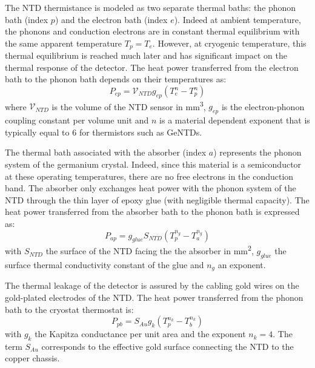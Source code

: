 The NTD thermistance is modeled as two separate thermal baths: the phonon bath (index $p$) and the electron bath (index $e$). Indeed at ambient temperature, the phonons and conduction electrons are in constant thermal equilibrium with the same apparent temperature $T_p = T_e$. However, at cryogenic temperature, this thermal equilibrium is reached much later and has significant impact on the thermal response of the detector. The heat power transferred from the electron bath to the phonon bath depends on their temperatures as:
\begin{equation}
\label{eq:ep-heat-power}
P_{ep}= \mathcal{V}_{NTD} g_{ep} (T_e^n - T_p^n)
\end{equation}
where $\mathcal{V}_{NTD}$ is the volume of the NTD sensor in \si{\mm^3}, $g_{ep}$ is the electron-phonon coupling constant per volume unit and $n$ is a material dependent exponent that is typically equal to 6 for thermistors such as GeNTDs.


The thermal bath associated with the absorber (index $a$) represents the phonon system of the germanium crystal. Indeed, since this material is a semiconductor at these operating temperatures, there are no free electrons in the conduction band. The absorber only exchanges heat power with the phonon system of the NTD through the thin layer of epoxy glue (with negligible thermal capacity). The heat power transferred from the absorber bath to the phonon bath is expressed as:
\begin{equation}
\label{eq:ap-heat-power}
P_{ap}=g_{glue} S_{NTD} \left( T_p^{n_g} - T_a^{n_g} \right)
\end{equation}
with $S_{NTD}$ the surface of the NTD facing the the absorber in \si{\mm^2}, $g_{glue}$ the surface thermal conductivity constant of the glue and $n_g$ an exponent. 

The thermal leakage of the detector is assured by the cabling gold wires on the gold-plated electrodes of the NTD. The heat power transferred from the phonon bath to the cryostat thermostat is:
\begin{equation}
\label{eq:pb-heat-transfer}
P_{pb}= S_{Au} g_k (T_p^{n_k} - T_b^{n_k})
\end{equation}
with $g_k$ the Kapitza conductance per unit area and the exponent $n_k=4$. The term $S_{Au}$ corresponds to the effective gold surface connecting the NTD to the copper chassis.


